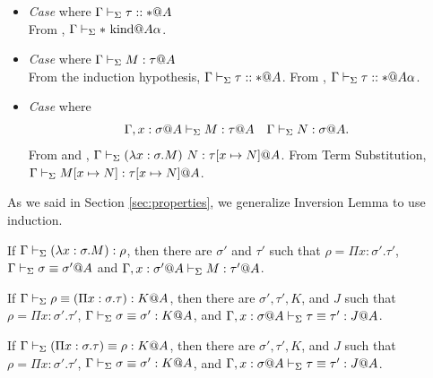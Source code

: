 \begin{itemize}
	\item \textit{Case} \KCsp{} where \(\Gamma\vdash_\Sigma \tau::* @A\) \\
	      From \WStar, \(\Gamma\vdash_\Sigma *\text{\ kind} @A\alpha\).
	      	  
	\item \textit{Case} \TCsp{} where \( \G\V M:\tau@A \) \\
	      From the induction hypothesis, \( \Gamma \vdash_\Sigma \tau :: * @ A \).
	      From \KCsp, \( \Gamma \vdash_\Sigma \tau :: * @ A\alpha \).
	      
	\item \textit{Case} \QBeta{} where
	      \begin{align*} 
	      	  & \G,x:\sigma@A\V M:\tau@A &   & \G\V N:\sigma@A. 
	      \end{align*}
	      From \TAbs{} and \TApp, \( \Gamma\vdash_\Sigma(\lambda x:\sigma.M)\ N : \tau[x \mapsto N]@A \).
	      From Term Substitution, \( \Gamma\vdash_\Sigma M[x\mapsto N] : \tau[x \mapsto N]@A \).
\end{itemize}

As we said in Section \ref{sec:properties}, we generalize Inversion Lemma to use induction.
\begin{lemma}
	\item If $\Gamma \vdash_\Sigma (\lambda x:\sigma.M) : \rho$, then there are $\sigma'$ and $\tau'$ such that
	$\rho = \Pi x:\sigma'.\tau'$, $\Gamma \vdash_\Sigma \sigma \equiv \sigma'@A$ and $\Gamma ,x:\sigma'@A\vdash_\Sigma M:\tau'@A$.
	\item If $\Gamma \vdash_\Sigma \rho \equiv (\Pi x:\sigma.\tau) : K @A$, then there are $\sigma', \tau', K$, and $J$ such that
	$\rho = \Pi x:\sigma'.\tau'$, $\Gamma \vdash_\Sigma \sigma \equiv \sigma' : K @A$, and $\G, x:\sigma@A\V \tau \E \tau' : J @A$.
	\item If $\Gamma \vdash_\Sigma (\Pi x:\sigma.\tau) \equiv \rho : K @A$, then there are $\sigma', \tau', K$, and $J$ such that
	$\rho = \Pi x:\sigma'.\tau'$, $\Gamma \vdash_\Sigma \sigma \equiv \sigma' : K @A$, and $\G, x:\sigma@A\V \tau \E \tau' : J @A$.
\end{lemma}


